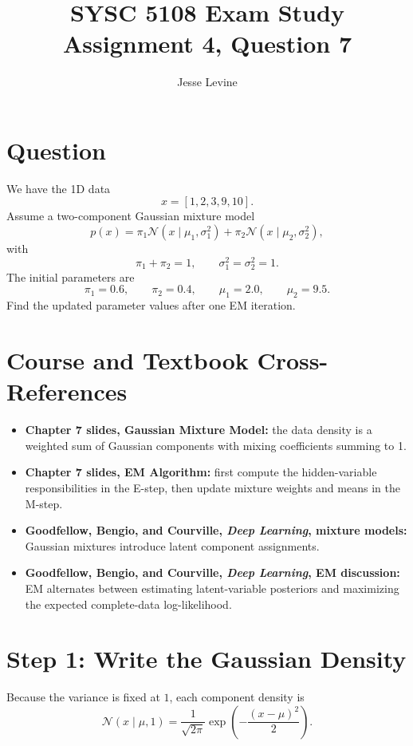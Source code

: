 \documentclass[11pt]{article}
\title{SYSC 5108 Exam Study\\Assignment 4, Question 7}
\author{Jesse Levine}
\date{}
\begin{document}
\maketitle

\section*{Question}

We have the 1D data
\[
    x = [1,2,3,9,10].
\]
Assume a two-component Gaussian mixture model
\[
    p(x)=\pi_1 \mathcal{N}(x\mid \mu_1,\sigma_1^2)+\pi_2 \mathcal{N}(x\mid \mu_2,\sigma_2^2),
\]
with
\[
    \pi_1+\pi_2=1,
    \qquad
    \sigma_1^2=\sigma_2^2=1.
\]
The initial parameters are
\[
    \pi_1=0.6,\qquad \pi_2=0.4,\qquad \mu_1=2.0,\qquad \mu_2=9.5.
\]
Find the updated parameter values after one EM iteration.

\section*{Course and Textbook Cross-References}

\begin{itemize}
    \item \textbf{Chapter 7 slides, Gaussian Mixture Model:} the data density is a
    weighted sum of Gaussian components with mixing coefficients summing to 1.
    \item \textbf{Chapter 7 slides, EM Algorithm:} first compute the hidden-variable
    responsibilities in the E-step, then update mixture weights and means in the
    M-step.
    \item \textbf{Goodfellow, Bengio, and Courville, \emph{Deep Learning}, mixture models:}
    Gaussian mixtures introduce latent component assignments.
    \item \textbf{Goodfellow, Bengio, and Courville, \emph{Deep Learning}, EM discussion:}
    EM alternates between estimating latent-variable posteriors and maximizing the
    expected complete-data log-likelihood.
\end{itemize}

\section*{Step 1: Write the Gaussian Density}

Because the variance is fixed at \(1\), each component density is
\[
    \mathcal{N}(x\mid \mu,1)
    =
    \frac{1}{\sqrt{2\pi}}
    \exp\!\left(-\frac{(x-\mu)^2}{2}\right).
\]
\end{document}
